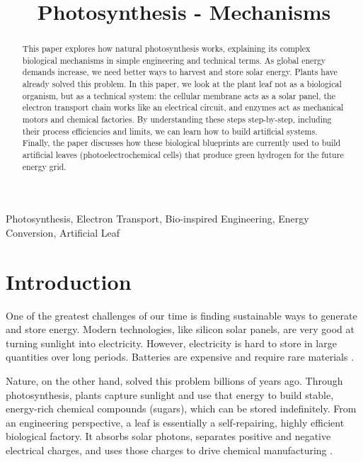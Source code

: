 \documentclass[conference]{IEEEtran}
\begin{document}
\title{Photosynthesis - Mechanisms}

\author{
}

\maketitle
\thispagestyle{plain}
\pagestyle{plain}

\begin{abstract}
This paper explores how natural photosynthesis works, explaining its complex biological mechanisms in simple engineering and technical terms. As global energy demands increase, we need better ways to harvest and store solar energy. Plants have already solved this problem. In this paper, we look at the plant leaf not as a biological organism, but as a technical system: the cellular membrane acts as a solar panel, the electron transport chain works like an electrical circuit, and enzymes act as mechanical motors and chemical factories. By understanding these steps step-by-step, including their process efficiencies and limits, we can learn how to build artificial systems. Finally, the paper discusses how these biological blueprints are currently used to build artificial leaves (photoelectrochemical cells) that produce green hydrogen for the future energy grid.
\end{abstract}

\begin{IEEEkeywords}
Photosynthesis, Electron Transport, Bio-inspired Engineering, Energy Conversion, Artificial Leaf
\end{IEEEkeywords}

\section{Introduction}
One of the greatest challenges of our time is finding sustainable ways to generate and store energy. Modern technologies, like silicon solar panels, are very good at turning sunlight into electricity. However, electricity is hard to store in large quantities over long periods. Batteries are expensive and require rare materials \cite{lewisCosteffectiveSolarEnergy2007}. 

Nature, on the other hand, solved this problem billions of years ago. Through photosynthesis, plants capture sunlight and use that energy to build stable, energy-rich chemical compounds (sugars), which can be stored indefinitely. From an engineering perspective, a leaf is essentially a self-repairing, highly efficient biological factory. It absorbs solar photons, separates positive and negative electrical charges, and uses those charges to drive chemical manufacturing \cite{barberPhotosyntheticEnergyConversion2009}.
\end{document}
